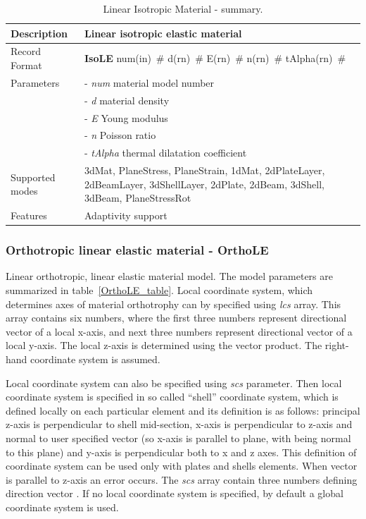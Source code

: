 \documentclass[a4paper]{article}
\newcommand{\descitem}[1]{{\noindent \bf #1}}
\newcommand{\elemparam}[2]{{{#1\tiny (#2)}~\#}}
\newcommand{\param}[1]{{\it #1}}
\begin{document}
\begin{table}[!htb]
\begin{tabular}{|l|p{9cm}|}
\hline
Description & Linear isotropic elastic material\\
\hline
Record Format & \descitem{IsoLE} \elemparam{num}{in}
\elemparam{d}{rn} \elemparam{E}{rn} \elemparam{n}{rn}
\elemparam{tAlpha}{rn}\\
Parameters &- \param{num} material model number\\
&- \param{d} material density\\
&- \param{E} Young modulus\\
&- \param{n} Poisson ratio\\
&- \param{tAlpha} thermal dilatation coefficient\\
Supported modes& 3dMat, PlaneStress, PlaneStrain, 1dMat,
2dPlateLayer, 2dBeamLayer, 3dShellLayer, 2dPlate, 2dBeam, 3dShell,
3dBeam, PlaneStressRot\\
Features & Adaptivity support\\
\hline
\end{tabular}
\caption{Linear Isotropic Material - summary.}
\label{IsoLE_table}
\end{table}



\subsubsection{Orthotropic linear elastic material - OrthoLE}
\label{OrthoLE}
Linear orthotropic, linear elastic  material model. The model parameters are summarized
in table~\ref{OrthoLE_table}.
Local coordinate system, which determines axes of material orthotrophy
can by specified using \param{lcs} array. This array contains six numbers,
where the first three numbers represent directional vector of a local x-axis,
and next three numbers represent directional vector of a local y-axis.
The local z-axis is determined using the vector product.
The right-hand coordinate system is assumed.

Local coordinate system
can also be specified using \param{scs} parameter. Then local coordinate
system is specified in so called ``shell''
coordinate system, which is defined locally on each particular element
and its definition is as follows: principal z-axis is perpendicular to
shell mid-section, x-axis is perpendicular to z-axis and normal to
user specified vector (so x-axis is parallel to plane, with  being
normal to this plane) and y-axis is perpendicular both to x and z
axes. This definition of coordinate system can be used only with plates
and shells elements.
When vector  is parallel to z-axis an error occurs. The \param{scs} array contain three numbers
defining direction vector . If no local coordinate system is
specified, by default a global coordinate system is used.
\end{document}
